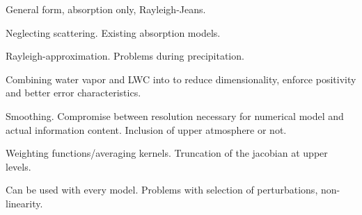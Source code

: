 \startsection[title=The Radiative Transfer Equation]

    General form, absorption only, Rayleigh-Jeans.

\stopsection


\startsection[title=Atmospheric Extinction]

    Neglecting scattering. Existing absorption models.

    \startsubsection[title=Oxygen Absorption]

    \stopsubsection

    \startsubsection[title=Water Vapor Absorption]

    \stopsubsection

    \startsubsection[title=Absorption by Liquid Water]

        Rayleigh-approximation. Problems during precipitation.

    \stopsubsection

    \startsubsection[title=Extinction by Other Constituents]

    \stopsubsection

    \startsubsection[title=Fast Absorption Prediction]

    \stopsubsection

\stopsection


\startsection[title=Representation of the Atmospheric State]

    \startsubsection[title=The Choice of State Vector Variables]

        Combining water vapor and LWC into  to
        reduce dimensionality, enforce positivity and better error
        characteristics.

    \stopsubsection

    \startsubsection[title=Vertical Discretization and Interpolation]

        Smoothing. Compromise between resolution necessary for numerical model
        and actual information content. Inclusion of upper atmosphere or not.

    \stopsubsection

\stopsection


\startsection[title=Calculating the Jacobian]

    Weighting functions/averaging kernels. Truncation of the jacobian at upper
    levels.

    \startsubsection[title=Finite Differences]

        Can be used with every model. Problems with selection of perturbations,
        non-linearity.
        
